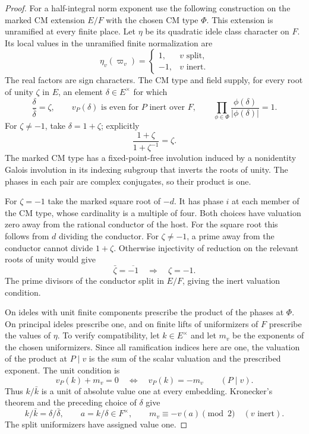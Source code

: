\begin{proof}
For a half-integral norm
exponent use the following construction on the marked CM
extension \(E/F\) with the chosen CM type \(\Phi\).
This extension is unramified at every finite place. Let
\(\eta\) be its quadratic idele class character on \(F\). Its local values in the unramified finite normalization are
\[
 \eta_v(\varpi_v)=
 \begin{cases}1,&v\text{ split},\\-1,&v\text{ inert} .\end{cases}
\]
The real factors are sign characters.
The CM type and field supply, for every root of unity \(\zeta\) in
\(E\), an element \(\delta\in E^\times\) for which
\[
 \frac{\delta}{\bar\delta}=\zeta,\qquad
 v_P(\delta)\text{ is even for }P\text{ inert over }F,\qquad
 \prod_{\phi\in\Phi}\frac{\phi(\delta)}{|\phi(\delta)|}=1 .
\]
For \(\zeta\ne-1\), take \(\delta=1+\zeta\); explicitly
\[
                   \frac{1+\zeta}{1+\zeta^{-1}}=\zeta .
\] The marked CM type has a fixed-point-free involution
induced by a nonidentity Galois involution in its indexing
subgroup that inverts the roots of unity. The phases in each
pair are complex conjugates, so their product is one.

For \(\zeta=-1\) take the marked square root of \(-d\).
It has phase \(i\) at each member of the CM type, whose
cardinality is a multiple of four. Both choices have
valuation zero away from the rational conductor of the host.
For the square root this follows from \(d\) dividing the
conductor. For \(\zeta\ne-1\), a prime away from the conductor cannot divide \(1+\zeta\). Otherwise injectivity of reduction on the relevant roots of unity would give
\[
 \bar\zeta=\overline{-1}\quad\Longrightarrow\quad\zeta=-1 .
\] The prime divisors of the
conductor split in \(E/F\), giving the inert valuation condition.
\label{cor:automorphic-realization-50}

On ideles with unit finite components prescribe the product of
the phases at \(\Phi\). On principal ideles prescribe one, and on
finite lifts of uniformizers of \(F\) prescribe the values of
\(\eta\). To verify compatibility, let \(k\in E^\times\) and let
\(m_v\) be the exponents of the chosen uniformizers. Since all ramification indices here are one, the valuation of the product at \(P\mid v\) is the sum of the scalar valuation and the prescribed exponent. The unit condition is
\[
 v_P(k)+m_v=0\quad\Longleftrightarrow\quad v_P(k)=-m_v\qquad(P\mid v).
\] Thus \(k/\bar k\) is a unit of absolute value
one at every embedding. Kronecker's theorem and the preceding
choice of \(\delta\) give
\[
 k/\bar k=\delta/\bar\delta,\qquad a=k/\delta\in F^\times,\qquad
 m_v\equiv-v(a)\pmod 2\quad(v\text{ inert}).
\]
The split uniformizers have assigned value one.


\end{proof}
